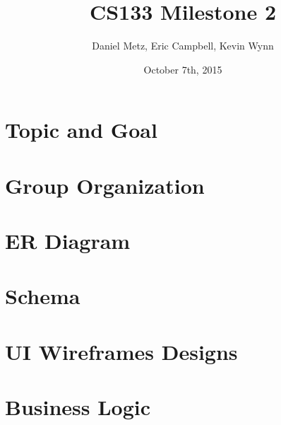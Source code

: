 \documentclass{article}
\title{CS133 Milestone 2}
\author{Daniel Metz, Eric Campbell, Kevin Wynn}
\date{October 7th, 2015}
\begin{document}
\maketitle

\section{Topic and Goal}


\section{Group Organization}


\section{ER Diagram}


\section{Schema}


\section{UI Wireframes Designs}


\section{Business Logic}

\end{document}
